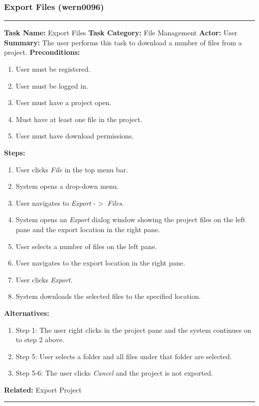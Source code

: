 \documentclass[11pt]{report}
\begin{document}
\subsubsection{Export Files (wern0096)}
\vspace{2pt}
\hrule
\vspace{8pt}
	\noindent\textbf{Task Name:} Export Files \newline
	\textbf{Task Category:} File Management \newline
	\textbf{Actor:} User \newline
	\textbf{Summary:} The user performs this task to download a number of files from a project. \newline
	\textbf{Preconditions:}
	\begin{enumerate}
		\item User must be registered.
		\item User must be logged in.
		\item User must have a project open.
		\item Must have at least one file in the project.
		\item User must have download permissions.
	\end{enumerate}
	\textbf{Steps:}
	\begin{enumerate}
		\item User clicks \textit{File} in the top menu bar.
		\item System opens a drop-down menu.
		\item User navigates to \textit{Export} -$>$ \textit{Files}.
		\item System opens an \textit{Export} dialog window showing the project files on the left pane and the export location in the right pane.
		\item User selects a number of files on the left pane.
		\item User navigates to the export location in the right pane.
		\item User clicks \textit{Export}.
		\item System downloads the selected files to the specified location.
	\end{enumerate}
	\textbf{Alternatives:}
	\begin{enumerate}
		\item Step 1: The user right clicks in the project pane and the system continues on to step 2 above.
		\item Step 5: User selects a folder and all files under that folder are selected.
		\item Step 5-6: The user clicks \textit{Cancel} and the project is not exported.
	\end{enumerate}
	\textbf{Related:} Export Project
\vspace{8pt}
\hrule
\newpage
\end{document}

